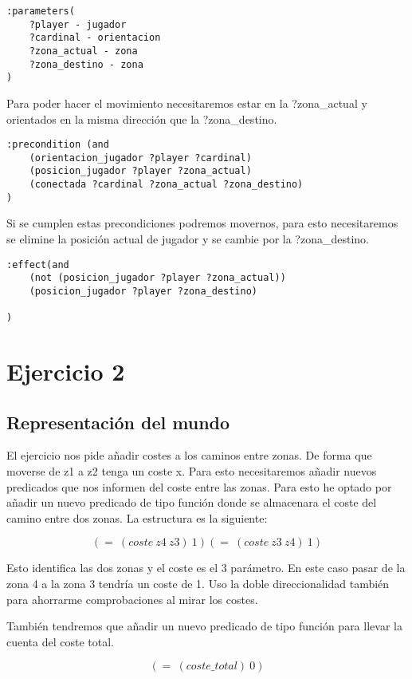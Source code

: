 \documentclass[]{article}
\begin{document}
\begin{enumerate}
\begin{lstlisting}
:parameters(
	?player - jugador 
	?cardinal - orientacion 
	?zona_actual - zona 
	?zona_destino - zona 
)
\end{lstlisting}

Para poder hacer el movimiento necesitaremos estar en la ?zona\_actual y orientados en la misma dirección que la ?zona\_destino. 

\begin{lstlisting}
:precondition (and 
	(orientacion_jugador ?player ?cardinal)
	(posicion_jugador ?player ?zona_actual)
	(conectada ?cardinal ?zona_actual ?zona_destino)
)
\end{lstlisting}

Si se cumplen estas precondiciones podremos movernos, para esto necesitaremos se elimine la posición actual de jugador y se cambie por la ?zona\_destino.

\begin{lstlisting}
:effect(and 
	(not (posicion_jugador ?player ?zona_actual))
	(posicion_jugador ?player ?zona_destino)

)
\end{lstlisting}
\end{enumerate}
\newpage

\section{Ejercicio 2}
\subsection{Representación del mundo}
El ejercicio nos pide añadir costes a los caminos entre zonas. De forma que moverse de z1 a z2 tenga un coste x. Para esto necesitaremos añadir nuevos predicados que nos informen del coste entre las zonas. Para esto he optado por añadir un nuevo predicado de tipo función donde se almacenara el coste del camino entre dos zonas. La estructura es la siguiente:

$$
(=\ (coste\ z4\ z3)\ 1)
(=\ (coste\ z3\ z4)\ 1)
$$

Esto identifica las dos zonas y el coste es el 3 parámetro. En este caso pasar de la zona 4 a la zona 3 tendría un coste de 1. Uso la doble direccionalidad también para ahorrarme comprobaciones al mirar los costes.

También tendremos que añadir un nuevo predicado de tipo función para llevar la cuenta del coste total. 

$$
(=\ (coste\_total)\ 0)
$$
\end{document}

